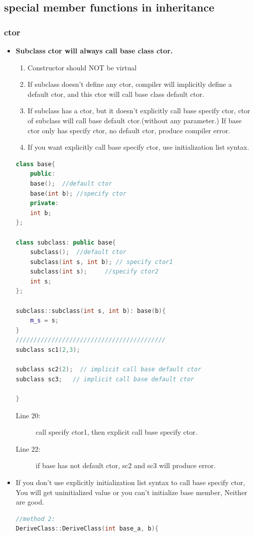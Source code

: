 \documentclass[a4paper,11pt,twoside]{book}
\begin{document}
\subsection{special member functions in inheritance}

\subsubsection{ctor}
\begin{itemize}
	
	\item  \textbf{Subclass ctor will always call base class ctor.}
	
	\begin{enumerate}
		\item Constructor should NOT be virtual
		
		\item If subclass doesn't define any ctor, compiler will implicitly define a default ctor, and this ctor will call base class default ctor.
		
		\item If subclass has a ctor, but it doesn't explicitly call base specify ctor, ctor of subclass will call base default ctor.(without any parameter.) If base ctor only has specify ctor, no default ctor, produce compiler error.
		
		\item If you want explicitly call base specify ctor, use initialization list syntax.
	\end{enumerate}
	
\begin{lstlisting}[frame=single, language=c++]
class base{
	public:
	base();  //default ctor
	base(int b); //specify ctor
	private:
	int b;
};
	
class subclass: public base{
	subclass();  //default ctor
	subclass(int s, int b); // specify ctor1
	subclass(int s);     //specify ctor2
	int s;
};
	
subclass::subclass(int s, int b): base(b){
	m_s = s;
}
//////////////////////////////////////////
subclass sc1(2,3);

subclass sc2(2);  // implicit call base default ctor
subclass sc3;   // implicit call base default ctor

}
\end{lstlisting}
\begin{description}
	\item[Line 20:] call specify ctor1, then explicit call base specify ctor.
	\item[Line 22:] if base has not default ctor, sc2 and sc3 will produce error.
\end{description}
	\item If you don't use  explicitly initialization list syntax to call base specify ctor, You will get uninitialized value or you can't initialize base member, Neither are good.
\begin{lstlisting}[frame=single, language=c++]
//method 2:
DeriveClass::DeriveClass(int base_a, b){
	

\end{lstlisting}
\end{itemize}
\end{document}
